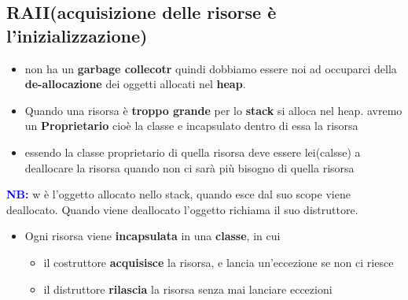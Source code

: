 \subsection{RAII(acquisizione delle risorse è l'inizializzazione)}
\begin{itemize}
    \item {} non ha un \textbf{garbage collecotr} quindi dobbiamo essere noi ad occuparci della \textbf{de-allocazione} dei oggetti allocati nel \textbf{ heap}.
    \item Quando una risorsa è \textbf{troppo grande} per lo\textbf{ stack} si alloca nel heap. avremo un \textbf{Proprietario} cioè la classe e incapsulato dentro di essa la risorsa
    \item  essendo la classe proprietario di quella risorsa deve essere lei(calsse) a deallocare la risorsa quando non ci sarà più bisogno di quella risorsa
\end{itemize}
\begin{tcolorbox}[width=15cm, boxsep=10pt]
    
    \textcolor{blue}{\textbf{NB:}} w è l'oggetto allocato nello stack, quando esce dal suo scope viene deallocato. Quando viene deallocato l'oggetto richiama il suo distruttore.
\end{tcolorbox}
\begin{itemize}
    \item Ogni risorsa viene \textbf{incapsulata} in una \textbf{classe}, in cui
    \begin{itemize}
        \item il costruttore \textbf{acquisisce} la risorsa, e lancia un’eccezione se
        non ci riesce
        \item il distruttore \textbf{rilascia} la risorsa senza mai lanciare eccezioni
        
    \end{itemize}
\end{itemize}